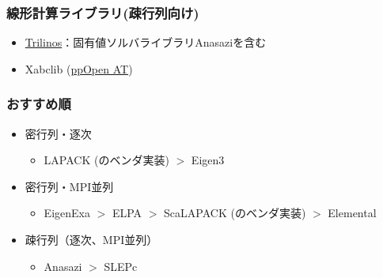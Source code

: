 \begin{frame}
  \frametitle{線形計算ライブラリ(疎行列向け)}
  \begin{itemize}
  \item \href{http://trilinos.org}{Trilinos}：固有値ソルバライブラリAnasaziを含む
  \item Xabclib (\href{http://ppopenhpc.cc.u-tokyo.ac.jp/}{ppOpen AT})
  \end{itemize}
\end{frame}

\begin{frame}
  \frametitle{おすすめ順}
  \begin{itemize}
  \item 密行列・逐次
    \begin{itemize}
      \item LAPACK (のベンダ実装) $>$ Eigen3
    \end{itemize}
  \item 密行列・MPI並列
    \begin{itemize}
      \item EigenExa $>$ ELPA $>$ ScaLAPACK (のベンダ実装) $>$ Elemental
    \end{itemize}
  \item 疎行列（逐次、MPI並列）
    \begin{itemize}
      \item Anasazi $>$ SLEPc
    \end{itemize}
  \end{itemize}
\end{frame}

